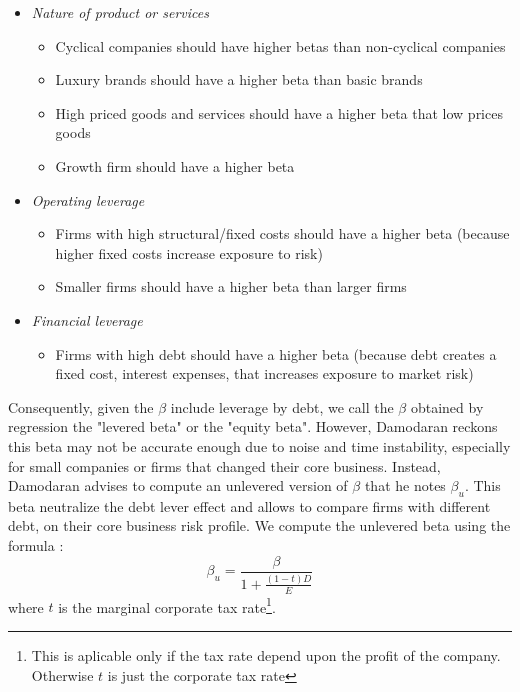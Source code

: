 \vspace{10cm}

\begin{itemize}
    \item \textit{Nature of product or services}
    \begin{itemize}
    \item Cyclical companies should have higher betas than non-cyclical companies

    \item Luxury brands should have a higher beta than basic brands

    \item High priced goods and services should have a higher beta that low prices goods

    \item Growth firm should have a higher beta
    \end{itemize}

    \item \textit{Operating leverage}
    \begin{itemize}
        \item Firms with high structural/fixed costs should have a higher beta (because higher fixed costs increase exposure to risk)

        \item Smaller firms should have a higher beta than larger firms
    \end{itemize}

    \item \textit{Financial leverage}

    \begin{itemize}
        \item Firms with high debt should have a higher beta (because debt creates a fixed cost, interest expenses, that increases exposure to market risk)
    \end{itemize}
    
\end{itemize}

Consequently, given  the $\beta$ include leverage by debt, we call the $\beta$ obtained by regression the "levered beta" or the "equity beta". However, Damodaran reckons this beta may not be accurate enough due to noise and time instability, especially for small companies or firms that changed their core business. Instead, Damodaran advises to compute an unlevered version of $\beta$ that he notes $\beta_u$. This beta neutralize the debt lever effect and allows to compare firms with different debt, on their core business risk profile. We compute the unlevered beta using the formula : 
\begin{equation}
   \displaystyle \beta_u = \frac{\beta}{1+\frac{(1-t)D}{E}} 
\end{equation}
where $t$ is the marginal corporate tax rate\footnote{This is aplicable only if the tax rate depend upon the profit of the company. Otherwise $t$ is just the corporate tax rate}. 

